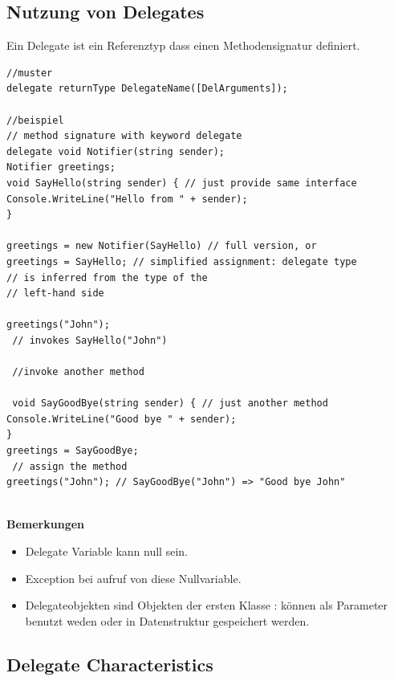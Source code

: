 \documentclass[a4paper,10pt]{scrartcl}
\begin{document}
\subsection{Nutzung von Delegates}
Ein Delegate ist ein Referenztyp dass einen Methodensignatur definiert.
\begin{lstlisting}[caption=Delegate Intro]
//muster
delegate returnType DelegateName([DelArguments]);

//beispiel
// method signature with keyword delegate
delegate void Notifier(string sender);
Notifier greetings;
void SayHello(string sender) { // just provide same interface
Console.WriteLine("Hello from " + sender);
}

greetings = new Notifier(SayHello) // full version, or
greetings = SayHello; // simplified assignment: delegate type
// is inferred from the type of the
// left-hand side

greetings("John");
 // invokes SayHello("John")
 
 //invoke another method
 
 void SayGoodBye(string sender) { // just another method
Console.WriteLine("Good bye " + sender);
}
greetings = SayGoodBye;
 // assign the method
greetings("John"); // SayGoodBye("John") => "Good bye John"


\end{lstlisting}
\textbf{Bemerkungen}
\begin{itemize}
 \item Delegate Variable kann null sein.
 \item Exception bei aufruf von diese Nullvariable.
 \item Delegateobjekten sind Objekten der ersten Klasse : können als Parameter benutzt weden oder in Datenstruktur gespeichert werden.
\end{itemize}


\subsection{Delegate Characteristics}
\end{document}
